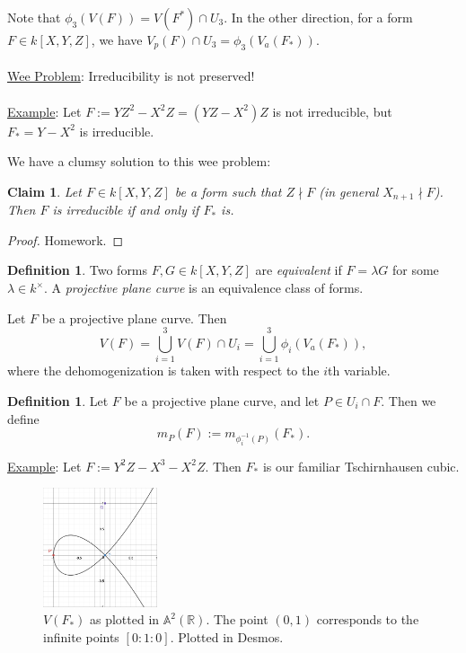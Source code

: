 \documentclass[12pt]{article}
\newcommand{\real}{\mathbb{R}}
\newcommand{\ita}[1]{\textit{#1}}
\newtheorem*{claim}{Claim}
\theoremstyle{definition}
\newtheorem{definition}[theorem]{Definition}
\begin{document}
Note that $\phi_3(V(F))=V(F^*)\cap U_3$. In the other direction, for a form $F\in k[X,Y,Z]$, we have $V_p(F)\cap U_3=\phi_3(V_a(F_*))$.\\\\
\underline{Wee Problem}: Irreducibility is not preserved!\\\\
\underline{Example}: Let $F:=YZ^2-X^2Z=(YZ-X^2)Z$ is not irreducible, but $F_*=Y-X^2$ is irreducible.

We have a clumsy solution to this wee problem: 
\begin{claim}
    Let $F\in k[X,Y,Z]$ be a form such that $Z\nmid F$ (in general $X_{n+1}\nmid F$). Then $F$ is irreducible if and only if $F_*$ is.
\end{claim}
\begin{proof}
    Homework.
\end{proof}
\begin{definition}
    Two forms $F,G\in k[X,Y,Z]$ are \ita{equivalent} if $F=\lambda G$ for some $\lambda\in k^{\times}$. A \ita{projective plane curve} is an equivalence class of forms.
\end{definition}
Let $F$ be a projective plane curve. Then
\begin{equation}
    V(F)=\bigcup\limits_{i=1}^3V(F)\cap U_i=\bigcup\limits_{i=1}^3\phi_i(V_a(F_*)),
\end{equation}
where the dehomogenization is taken with respect to the $i$th variable.
\begin{definition}
    Let $F$ be a projective plane curve, and let $P\in U_i\cap F$. Then we define
    \begin{equation}
        m_P(F):=m_{\phi_i^{-1}(P)}(F_*).
    \end{equation}
\end{definition}
\underline{Example}: Let $F:=Y^2Z-X^3-X^2Z$. Then $F_*$ is our familiar Tschirnhausen cubic.
\begin{figure}[H]
    \centering
    \includegraphics[width=0.3\textwidth]{32.png}
    \caption{$V(F_*)$ as plotted in $\mathbb{A}^2(\real)$. The point $(0,1)$ corresponds to the infinite points $[0:1:0]$. Plotted in Desmos.}
\end{figure}
\end{document}
